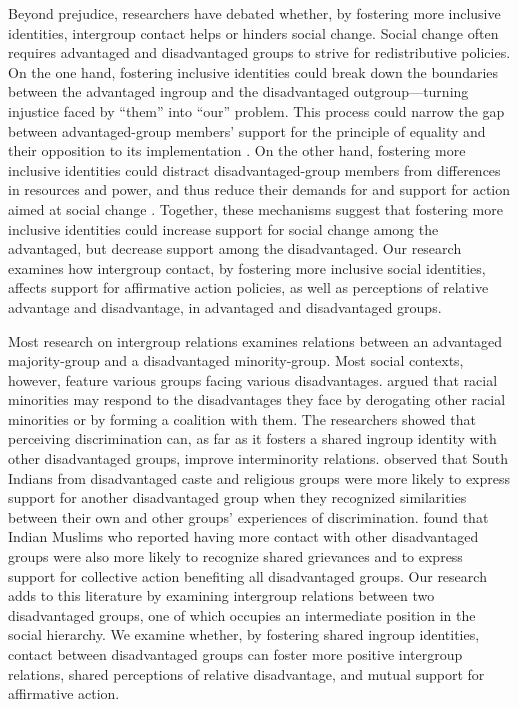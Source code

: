 \documentclass[12pt, a4paper]{article}
\begin{document}
Beyond prejudice, researchers have debated whether, by fostering more inclusive identities, intergroup contact helps or hinders social change. Social change often requires advantaged and disadvantaged groups to strive for redistributive policies. On the one hand, fostering inclusive identities could break down the boundaries between the advantaged ingroup and the disadvantaged outgroup---turning injustice faced by ``them'' into ``our'' problem. This process could narrow the gap between advantaged-group members' support for the principle of equality and their opposition to its implementation \cite{dixon_intergroup_2007}. On the other hand, fostering more inclusive identities could distract disadvantaged-group members from differences in resources and power, and thus reduce their demands for and support for action aimed at social change \cite{dovidio_darker_2012, saguy_irony_2009}. Together, these mechanisms suggest that fostering more inclusive identities could increase support for social change among the advantaged, but decrease support among the disadvantaged. Our research examines how intergroup contact, by fostering more inclusive social identities, affects support for affirmative action policies, as well as perceptions of relative advantage and disadvantage, in advantaged and disadvantaged groups.

Most research on intergroup relations examines relations between an advantaged majority-group and a disadvantaged minority-group. Most social contexts, however, feature various groups facing various disadvantages.  argued that racial minorities may respond to the disadvantages they face by  derogating other racial minorities or by forming a coalition with them. The researchers showed that perceiving discrimination can, as far as it fosters a shared ingroup identity with other disadvantaged groups, improve interminority relations.  observed that South Indians from disadvantaged caste and religious groups were more likely to express support for another disadvantaged group when they recognized similarities between their own and other groups' experiences of discrimination.  found that Indian Muslims who reported having more contact with other disadvantaged groups were also more likely to recognize shared grievances and to express support for collective action benefiting all disadvantaged groups. Our research adds to this literature by examining intergroup relations between two disadvantaged groups, one of which occupies an intermediate position in the social hierarchy. We examine whether, by fostering shared ingroup identities, contact between disadvantaged groups can foster more positive intergroup relations, shared perceptions of relative disadvantage, and mutual support for affirmative action.
\end{document}
